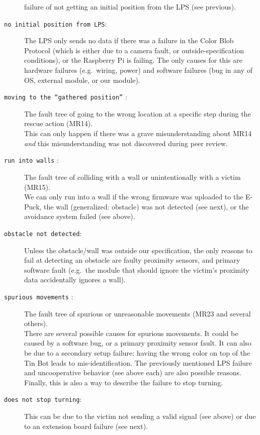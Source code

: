 \documentclass[a4paper,parskip,headheight=38pt]{scrartcl} %
\begin{document}
\begin{description}
    failure of not getting an initial position from the LPS (see
    previous).
\item[\texttt{no initial position from LPS}:]
    The LPS only sends no data if there was a failure in the Color Blob
    Protocol (which is either due to a camera fault, or
    outside-specification conditions), or the Raspberry Pi is failing.
    The only causes for this are hardware failures (e.g.\ wiring,
    power) and software failures (bug in any of OS, external module, or
    our module).
\item[\texttt{moving to the \enquote{gathered position}} \refpdf{gowrong}:]
    The fault tree of going to the wrong location at a specific step
    during the rescue action (MR14).
     \\
    This can only happen if there was a grave misunderstanding about
    MR14 \emph{and} this misunderstanding was not discovered during
    peer review.
\item[\texttt{run into walls} \refpdf{runintowall}:]
    The fault tree of colliding with a wall or unintentionally with a
    victim (MR15).
     \\
    We can only run into a wall if the wrong firmware was uploaded to
    the E-Puck, the wall (generalized: obstacle) was not detected (see
    next), or the avoidance system failed (see above).
\item[\texttt{obstacle not detected}:]
    Unless the obstacle/wall was outside our specification, the only
    reasons to fail at detecting an obstacle are faulty proximity
    sensors, and primary software fault (e.g.\ the module that should
    ignore the victim's proximity data accidentally ignores a wall).
\item[\texttt{spurious movements} \refpdf{spuriousmovements}:]
    The fault tree of spurious or unreasonable movements (MR23 and
    several others).
     \\
    There are several possible causes for spurious movements.  It could
    be caused by a software bug, or a primary proximity sensor fault.
    It can also be due to a secondary setup failure: having the wrong
    color on top of the Tin Bot leads to mis-identification.  The
    previously mentioned LPS failure and uncooperative behavior (see
    above each) are also possible reasons. Finally, this is also a way
    to describe the failure to stop turning.
\item[\texttt{does not stop turning}:]
    This can be due to the victim not sending a valid signal (see
    above) or due to an extension board failure (see next).

\end{description}
\end{document}
